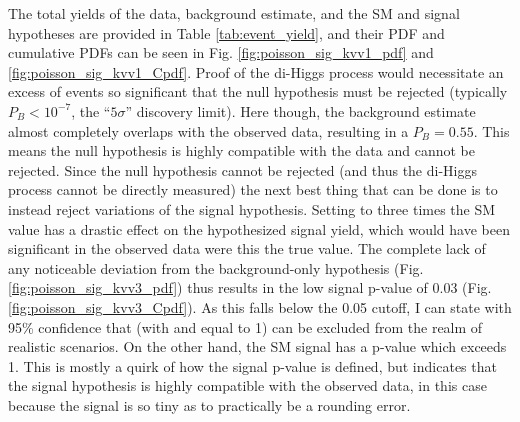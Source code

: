     The total yields of the data, background estimate, and the SM and  signal hypotheses are provided in Table \ref{tab:event_yield},
        and their PDF and cumulative PDFs can be seen in Fig. \ref{fig:poisson_sig_kvv1_pdf} and \ref{fig:poisson_sig_kvv1_Cpdf}.
    Proof of the di-Higgs process would necessitate an excess of events so significant that
        the null hypothesis must be rejected (typically $P_B < 10^{-7}$, the ``$5\sigma$'' discovery limit).
    Here though, the background estimate almost completely overlaps with the observed data,
        resulting in a $P_B = 0.55$.
    This means the null hypothesis is highly compatible with the data and cannot be rejected.
    Since the null hypothesis cannot be rejected (and thus the di-Higgs process cannot be directly measured)
        the next best thing that can be done is to instead reject variations of the signal hypothesis.
    Setting \kvv to three times the SM value has a drastic effect on the hypothesized signal yield,
        which would have been significant in the observed data were this the true value.
    The complete lack of any noticeable deviation from the background-only hypothesis (Fig. \ref{fig:poisson_sig_kvv3_pdf})
        thus results in the low signal p-value of 0.03 (Fig. \ref{fig:poisson_sig_kvv3_Cpdf}).
    As this falls below the 0.05 cutoff, I can state with 95\% confidence that  (with \kl and \kv equal to 1)
        can be excluded from the realm of realistic scenarios.
    On the other hand, the SM signal has a p-value which exceeds 1.
    This is mostly a quirk of how the signal p-value is defined,
        but indicates that the signal hypothesis is highly compatible with the observed data,
        in this case because the signal is so tiny as to practically be a rounding error.

